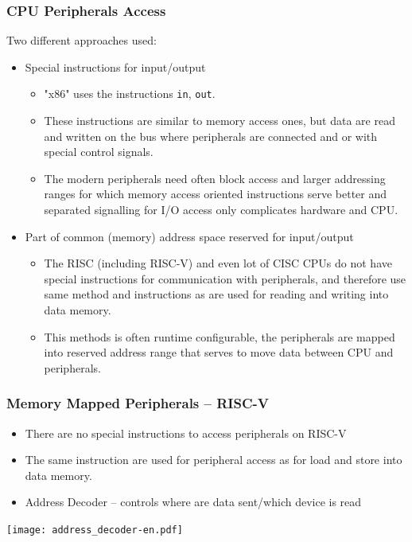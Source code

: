 \documentclass{beamer}
\begin{document}
\begin{frame}
\frametitle{CPU Peripherals Access}

Two different approaches used:
\begin{itemize}
\item Special instructions for input/output
\begin{itemize}
\item "x86" uses the instructions \texttt{in}, \texttt{out}.
\item These instructions are similar to memory access ones, but data are read and written on the bus where peripherals are connected and or with special control signals.
\item The modern peripherals need often block access and larger addressing ranges for which memory access oriented instructions serve better and separated signalling for I/O access only complicates hardware and CPU.
\end{itemize}
\item Part of common (memory) address space reserved for input/output
\begin{itemize}
\item The RISC (including RISC-V) and even lot of CISC CPUs do not have special instructions for communication with peripherals, and therefore use same method and instructions as are used for reading and writing into data memory.
\item This methods is often runtime configurable, the peripherals are mapped into reserved address range that serves to move data between CPU and peripherals.
\end{itemize}
\end{itemize}
\end{frame}


\begin{frame}
\frametitle{Memory Mapped Peripherals -- RISC-V}

\begin{itemize}
\item There are no special instructions to access peripherals on RISC-V \item The same instruction are used for peripheral access as for load and store into data memory.
\item Address Decoder -- controls where are data sent/which device is read
\end{itemize}
\begin{center}
\texttt{[image: address\_decoder-en.pdf]}
\end{center}
\end{frame}
\end{document}
